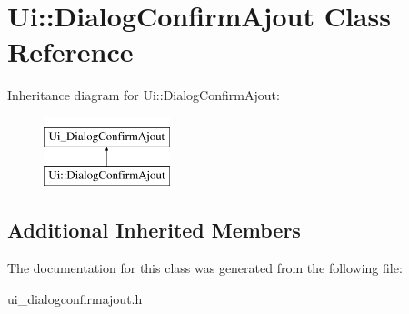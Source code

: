 \hypertarget{classUi_1_1DialogConfirmAjout}{\section{Ui\-:\-:Dialog\-Confirm\-Ajout Class Reference}
\label{classUi_1_1DialogConfirmAjout}
}
Inheritance diagram for Ui\-:\-:Dialog\-Confirm\-Ajout\-:\begin{figure}[H]
\begin{center}
\leavevmode
\includegraphics[height=2.000000cm]{classUi_1_1DialogConfirmAjout}
\end{center}
\end{figure}
\subsection*{Additional Inherited Members}


The documentation for this class was generated from the following file\-:\begin{DoxyCompactItemize}
\item 
ui\-\_\-dialogconfirmajout.\-h\end{DoxyCompactItemize}
